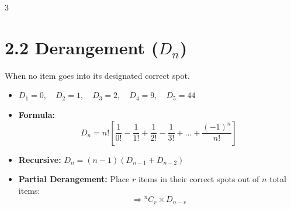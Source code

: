 \documentclass[11pt,a4paper,landscape]{article}
\begin{document}
\begin{multicols*}{3}
\section*{2.2 Derangement ($D_n$)}
When no item goes into its designated correct spot.
\begin{itemize}
\item $D_1 = 0, \quad D_2 = 1, \quad D_3 = 2, \quad D_4 = 9, \quad D_5 = 44$
\item \textbf{Formula:}
  $$ D_n = n! \left[ \frac{1}{0!} - \frac{1}{1!} + \frac{1}{2!} - \frac{1}{3!} + \dots + \frac{(-1)^n}{n!} \right] $$
\item \textbf{Recursive:} $D_n = (n-1)(D_{n-1} + D_{n-2})$
\item \textbf{Partial Derangement:} Place $r$ items in their correct spots out of $n$ total items:
  $$\Rightarrow {}^nC_r \times D_{n-r}$$
\end{itemize}

\end{multicols*}
\end{document}

